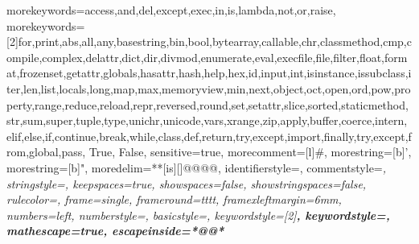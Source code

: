 \usepackage{amsfonts} %
\usepackage{bbm} %
\usepackage{eurosym} %

\usepackage{xcolor}

\newcommand\Pdef{P_{\text{def}}}
\newcommand\Psur{P_{\text{sur}}}
\newcommand\cov{\text{Cov}}
\newcommand\var{\text{Var}}

\usepackage{hyperref}
\hypersetup{
	breaklinks=true,  %
	colorlinks=true,
	urlcolor=rahmen,
	linkcolor=rahmen,
	citecolor=rahmen,
}
\hypersetup{linkcolor=rahmen}

\providecommand{\tightlist}{\setlength{\itemsep}{0pt}\setlength{\parskip}{0pt}}

\usepackage{subfig} %

\usepackage{cprotect}
 {
	morekeywords={access,and,del,except,exec,in,is,lambda,not,or,raise},
	morekeywords=[2]{for,print,abs,all,any,basestring,bin,bool,bytearray,callable,chr,classmethod,cmp,compile,complex,delattr,dict,dir,divmod,enumerate,eval,execfile,file,filter,float,format,frozenset,getattr,globals,hasattr,hash,help,hex,id,input,int,isinstance,issubclass,iter,len,list,locals,long,map,max,memoryview,min,next,object,oct,open,ord,pow,property,range,reduce,reload,repr,reversed,round,set,setattr,slice,sorted,staticmethod,str,sum,super,tuple,type,unichr,unicode,vars,xrange,zip,apply,buffer,coerce,intern,elif,else,if,continue,break,while,class,def,return,try,except,import,finally,try,except,from,global,pass, True, False},
	sensitive=true,
	morecomment=[l]\#,
	morestring=[b]',
	morestring=[b]",
	moredelim=**[is][\color{black}]{@@}{@@},
	identifierstyle=\color{black}\footnotesize\ttfamily,
    commentstyle=\color{ipython-cyan}\footnotesize\itshape\ttfamily,
	stringstyle=\color{ipython-red}\footnotesize\ttfamily,
	keepspaces=true,
	showspaces=false,
    showstringspaces=false,
	rulecolor=\color{ipython-frame},
	frame=single,
	frameround={t}{t}{t}{t},
	framexleftmargin=6mm,
	numbers=left,
	numberstyle=\color{black},
	basicstyle=\footnotesize\ttfamily,
	keywordstyle=[2]\color{ipython-green}\bfseries\footnotesize\ttfamily, 
	keywordstyle=\color{ipython-purple}\bfseries\footnotesize\ttfamily,
	mathescape=true,
	escapeinside={*@}{@*}
}

